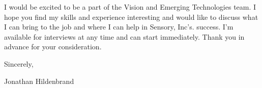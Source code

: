 \documentclass[letterpaper,12pt]{article}[leftmargin=*]
\begin{document}
\vspace{12pt}

\hspace{24pt}I would be excited to be a part of the Vision and Emerging Technologies team. I hope you find my skills and experience interesting and would like to discuss what I can bring to the job and where I can help in Sensory, Inc's. success. I'm available for interviews at any time and can start immediately. Thank you in advance for your consideration.

\vspace{24pt}

Sincerely,

\vspace{12pt}

Jonathan Hildenbrand

\end{document}
